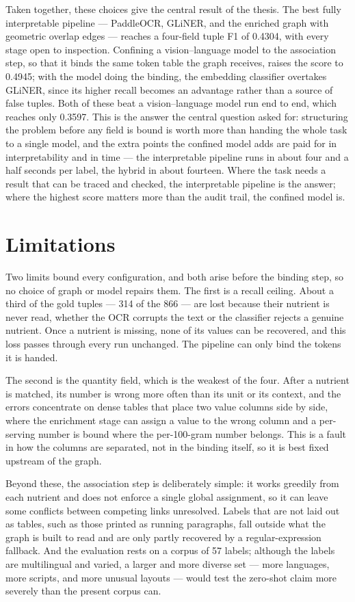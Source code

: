 Taken together, these choices give the central result of the thesis. The best
fully interpretable pipeline --- PaddleOCR, GLiNER, and the enriched graph with
geometric overlap edges --- reaches a four-field tuple F1 of 0.4304, with every
stage open to inspection. Confining a vision--language model to the association
step, so that it binds the same token table the graph receives, raises the score
to 0.4945; with the model doing the binding, the embedding classifier overtakes
GLiNER, since its higher recall becomes an advantage rather than a source of false
tuples. Both of these beat a vision--language model run end to end, which reaches
only 0.3597. This is the answer the central question asked for: structuring the
problem before any field is bound is worth more than handing the whole task to a
single model, and the extra points the confined model adds are paid for in
interpretability and in time --- the interpretable pipeline runs in about four and
a half seconds per label, the hybrid in about fourteen. Where the task needs a
result that can be traced and checked, the interpretable pipeline is the answer;
where the highest score matters more than the audit trail, the confined model is.

\section{Limitations}\label{sec:concl-limitations}

Two limits bound every configuration, and both arise before the binding step, so
no choice of graph or model repairs them. The first is a recall ceiling. About a
third of the gold tuples --- 314 of the 866 --- are lost because their nutrient is
never read, whether the OCR corrupts the text or the classifier rejects a genuine
nutrient. Once a nutrient is missing, none of its values can be recovered, and
this loss passes through every run unchanged. The pipeline can only bind the
tokens it is handed.

The second is the quantity field, which is the weakest of the four. After a
nutrient is matched, its number is wrong more often than its unit or its context,
and the errors concentrate on dense tables that place two value columns side by
side, where the enrichment stage can assign a value to the wrong column and a
per-serving number is bound where the per-100-gram number belongs. This is a fault
in how the columns are separated, not in the binding itself, so it is best fixed
upstream of the graph.

Beyond these, the association step is deliberately simple: it works greedily from
each nutrient and does not enforce a single global assignment, so it can leave
some conflicts between competing links unresolved. Labels that are not laid out as
tables, such as those printed as running paragraphs, fall outside what the graph
is built to read and are only partly recovered by a regular-expression fallback.
And the evaluation rests on a corpus of 57 labels; although the labels are
multilingual and varied, a larger and more diverse set --- more languages, more
scripts, and more unusual layouts --- would test the zero-shot claim more severely
than the present corpus can.

